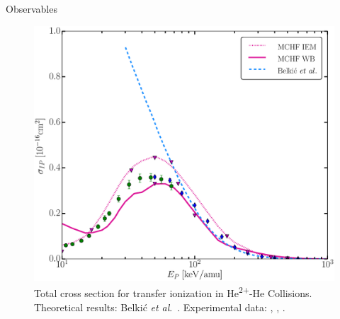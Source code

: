 \documentclass[letterpaper, 12 pt]{report}
\begin{document}
\begin{chapter}{Observables \label{chap:p-he2p-he}}
\begin{figure}[htp]
   \centering
   \includegraphics[width = \linewidth]{./images/he2phe/he2phe-IP.eps}
   \caption[Total cross section for transfer ionization in He\textsuperscript{2+}-He
            Collisions.]{Total cross section for transfer ionization in He\textsuperscript{2+}-He
            Collisions. Theoretical results: Belki\'{c} \textit{et al}.\ \cite{BMM-97}.
            Experimental data: {\color{blue}{$\blacklozenge$}} \cite{SG85},
            {\color{OliveGreen}{$\bullet$}} \cite{SG89}, {\color{RedViolet}{$\blacktriangledown$}}
            \cite{Dubois87}. \label{fig:he2phe-ip}}
\end{figure}


\end{chapter}
\end{document}
